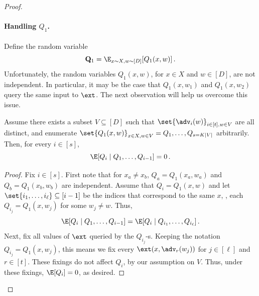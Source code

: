 \documentclass{toc}
\begin{document}
\begin{proof}
\paragraph{Handling $Q_1$.} Define the random variable
\[
\mathbf{Q}_1 = \E_{x \sim X,w \sim [D]}[Q_{1}(x,w)]\,.
\]
Unfortunately, the random variables $Q_{1}(x,w)$, 
for $x \in X$ and
$w \in [D]$, are not independent. In particular, it may be the case that $Q_1(x,w_1)$
and $Q_1(x,w_2)$ query the same input to $\ext$.
The next observation will help us overcome
this issue.
\begin{claim}\label{claim:partition}
Assume there exists a subset $V \subseteq [D]$ such that 
$\set{\adv_{i}(w)}_{i \in [t],w \in V}$ are all distinct, and enumerate
$\set{Q_1(x,w)}_{x \in X,w \in V} = Q_{1},\ldots,Q_{s = K|V|}$ arbitrarily. Then, for every $i \in [s]$,
\[\E[Q_{i} \mid Q_{1},\ldots,Q_{i-1}]=0\,.\]
\end{claim}
\begin{proof}
Fix $i \in [s]$.
First note that for $x_a \neq x_b$, $Q_{a} = Q_1(x_a,w_a)$ and $Q_{b} = Q_1(x_b,w_b)$ 
are independent. Assume that $Q_i = Q_{1}(x,w)$
and let $\set{i_1,\ldots,i_\ell} \subseteq [i-1]$ be the indices that correspond to the same $x$,
\ie, each $Q_{i_j} = Q_{1}(x,w_j)$ for some $w_j \neq w$. Thus,
\[\E[Q_{i} \mid Q_{1},\ldots,Q_{i-1}]=\E[Q_{i} \mid Q_{i_1},\ldots,Q_{i_\ell}]\,.\]
Next, fix all values of $\ext$ queried by the $Q_{i_j}$-s. Keeping the notation
$Q_{i_j} = Q_1(x,w_j)$, this means we fix every
$\ext(x,\adv_{r}(w_j))$ for $j \in [\ell]$ and $r \in [t]$. These fixings do not
affect $Q_i$, by our assumption on $V$. Thus, under these fixings, $\E[Q_i] = 0$, 
as desired.
\end{proof}


\end{proof}
\end{document}
